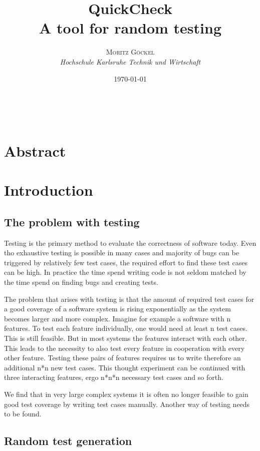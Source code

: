 \documentclass[a4paper, 12pt]{article} %
\title{\textbf{QuickCheck}\\ %
A tool for random testing} %
\author{\textsc{Moritz G\"ockel} %
\\{\textit{Hochschule Karlsruhe Technik und Wirtschaft}}} %
\date{\today}
\makeatletter
\renewcommand{\maketitle}{ 
\begin{flushright} %
{\LARGE\@title} %

\vspace{50pt} %

{\large\@author}
\\\@date 

\vspace{40pt}
\end{flushright}
}
\makeatother
\begin{document}
\maketitle

\vspace{30pt}

\newpage
\tableofcontents
\newpage

\section{Abstract}

\section{Introduction}
\subsection{The problem with testing}

Testing is the primary method to evaluate the correctness of software today. \cite{Ammann2016} Even tho exhaustive testing is possible in many cases and majority of bugs can be triggered by relatively few test cases, \cite{Kuhn2004} the required effort to find these test cases can be high. In practice the time spend writing code is not seldom matched by the time spend on finding bugs and creating tests.

The problem that arises with testing is that the amount of required test cases for a good coverage of a software system is rising exponentially as the system becomes larger and more complex. Imagine for example a software with n features. To test each feature individually, one would need at least n test cases. This is still feasible. But in most systems the features interact with each other. This leads to the necessity to also test every feature in cooperation with every other feature. Testing these pairs of features requires us to write therefore an additional n*n new test cases. This thought experiment can be continued with three interacting features, ergo n*n*n necessary test cases and so forth. \cite{Hughes2016}

We find that in very large complex systems it is often no longer feasible to gain good test coverage by writing test cases manually. Another way of testing needs to be found. 

\subsection{Random test generation}
\end{document}
